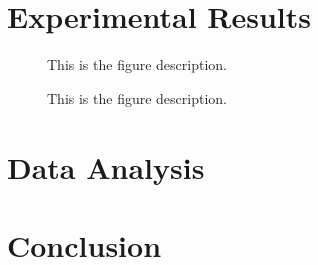\documentclass[oneside, astronomy, noacknowlegments]{BYUPhys}
\begin{document}
\section{Experimental Results}

\begin{figure}
    \caption[Experimental ODMR for SiC]{\label{fig:SiCResults}
     This is the figure description.}
 \end{figure}

\begin{figure}
    \caption[Experimental ODMR for CdTe]{\label{fig:CdTeResults}
     This is the figure description.}
 \end{figure}


\section{Data Analysis}

\section{Conclusion}
\end{document}
